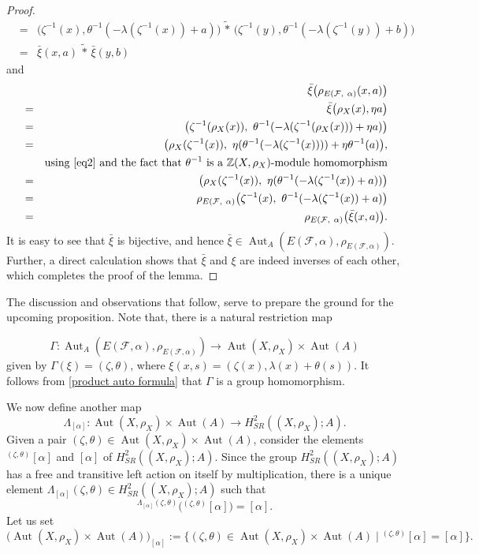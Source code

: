 \documentclass[11pt,reqno]{amsart}
\theoremstyle{definition}
\numberwithin{equation}{subsection}
\begin{document}
\begin{proof}
\begin{eqnarray*}
		&=& \big(\zeta^{-1}(x), \theta^{-1}(-\lambda({\zeta^{-1}(x)}) + a)\big) \, \tilde{*} \, \big(\zeta^{-1}(y), \theta^{-1}(-\lambda({\zeta^{-1}(y)}) + b) \big) \\
		&=& \bar{\xi}(x,a) \, \tilde{*} \, \bar{\xi}(y,b)
	\end{eqnarray*}
and
\begin{eqnarray*}
&& \bar{\xi}\big(\rho_{E(\mathcal{F}, ~\alpha)}(x,a) \big) \\
		&=& \bar{\xi} \big(\rho_X(x), \eta a \big) \\
		&=& \big(\zeta^{-1}(\rho_X(x)), ~\theta^{-1}(-\lambda(\zeta^{-1}(\rho_X(x)))+ \eta a)\big)\\
		&=&\big( \rho_X(\zeta^{-1}(x)), ~\eta(\theta^{-1}(-\lambda(\zeta^{-1}(x))))+\eta \theta^{-1}(a) \big),\\
		 && \text{using \eqref{eq2} and the fact that $\theta^{-1}$ is a $\mathbb{Z}(X, \rho_{X})$-module homomorphism}\\
		&=&\big( \rho_X(\zeta^{-1}(x)), ~\eta(\theta^{-1}(-\lambda(\zeta^{-1}(x))+a))\big)\\
		&=&\rho_{E(\mathcal{F}, ~\alpha)} \big(\zeta^{-1}(x), ~\theta^{-1}(-\lambda(\zeta^{-1}(x))+a)\big)\\
		&=&\rho_{E(\mathcal{F}, ~\alpha)} \big(\bar{\xi}(x,a) \big).
	\end{eqnarray*}
It is easy to see that $\bar{\xi}$ is bijective, and hence $\bar{\xi} \in \operatorname{Aut}_{A}(E(\mathcal{F}, \alpha),\rho_{E(\mathcal{F}, \alpha)}).$ Further, a direct calculation shows that $\bar{\xi}$ and $\xi$ are indeed inverses of each other, which completes the proof of the lemma.
\end{proof}

The discussion and observations that follow, serve to prepare the ground for the upcoming proposition. Note that, there is a natural restriction map

$$
\Gamma: \operatorname{Aut}_{A}(E(\mathcal{F}, \alpha),\rho_{E(\mathcal{F}, \alpha)}) \longrightarrow \operatorname{Aut}(X, \rho_{X}) \times \operatorname{Aut}(A)
$$
given by $\Gamma(\xi)=(\zeta, \theta)$, where $\xi(x, s)=(\zeta(x), \lambda(x) +\theta(s))$. It follows from \eqref{product auto formula} that $\Gamma$ is a group homomorphism.
\par

We now define another map
$$
\Lambda_{[\alpha]}: \operatorname{Aut}(X, \rho_{X}) \times \operatorname{Aut}(A) \longrightarrow H_{SR}^{2}((X, \rho_{X});A). 
$$
Given a pair $(\zeta, \theta) \in \operatorname{Aut}(X,\rho_X) \times \operatorname{Aut}(A)$, consider the elements  ${}^{(\zeta,\theta)}[\alpha]$ and $[\alpha]$ of $H_{SR}^{2}((X, \rho_{X});A)$. Since the group $H_{S R}^{2}((X, \rho_{X}) ; A)$ has a free and transitive left action on itself by multiplication, there is a unique element $\Lambda_{[\alpha]}(\zeta, \theta) \in H_{S R}^{2}((X, \rho_{X}) ; A)$ such that
$$
{}^{\Lambda_{[\alpha]}(\zeta, \theta)}\big({}^{(\zeta, \theta)}[\alpha] \big)=[\alpha]. 
$$
Let us set
$$
\big(\operatorname{Aut}(X, \rho_{X}) \times \operatorname{Aut}(A)\big)_{[\alpha]} := \big\{(\zeta, \theta) \in \operatorname{Aut}(X, \rho_{X}) \times \operatorname{Aut}(A) \mid {}^{(\zeta,\theta)}[\alpha]=[\alpha] \big\}.		
$$
\end{document}
